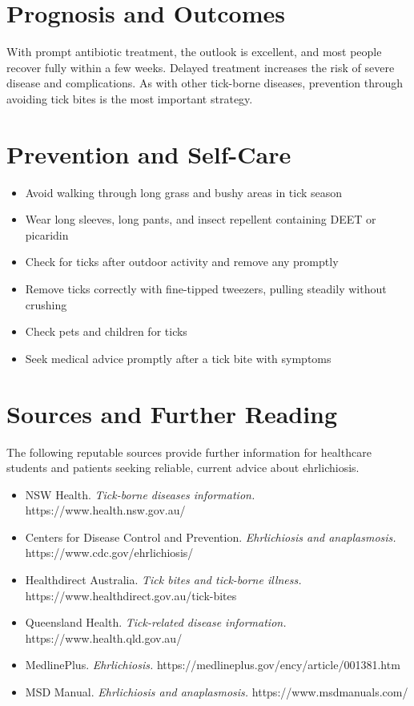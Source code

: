 \section*{Prognosis and Outcomes}
With prompt antibiotic treatment, the outlook is excellent, and most people recover fully within a few weeks. Delayed treatment increases the risk of severe disease and complications. As with other tick-borne diseases, prevention through avoiding tick bites is the most important strategy.

\section*{Prevention and Self-Care}
\begin{itemize}
    \item Avoid walking through long grass and bushy areas in tick season
    \item Wear long sleeves, long pants, and insect repellent containing DEET or picaridin
    \item Check for ticks after outdoor activity and remove any promptly
    \item Remove ticks correctly with fine-tipped tweezers, pulling steadily without crushing
    \item Check pets and children for ticks
    \item Seek medical advice promptly after a tick bite with symptoms
\end{itemize}

\section*{Sources and Further Reading}
The following reputable sources provide further information for healthcare students and patients seeking reliable, current advice about ehrlichiosis.
\begin{itemize}
    \item NSW Health. \textit{Tick-borne diseases information.} https://www.health.nsw.gov.au/
    \item Centers for Disease Control and Prevention. \textit{Ehrlichiosis and anaplasmosis.} https://www.cdc.gov/ehrlichiosis/
    \item Healthdirect Australia. \textit{Tick bites and tick-borne illness.} https://www.healthdirect.gov.au/tick-bites
    \item Queensland Health. \textit{Tick-related disease information.} https://www.health.qld.gov.au/
    \item MedlinePlus. \textit{Ehrlichiosis.} https://medlineplus.gov/ency/article/001381.htm
    \item MSD Manual. \textit{Ehrlichiosis and anaplasmosis.} https://www.msdmanuals.com/
\end{itemize}
